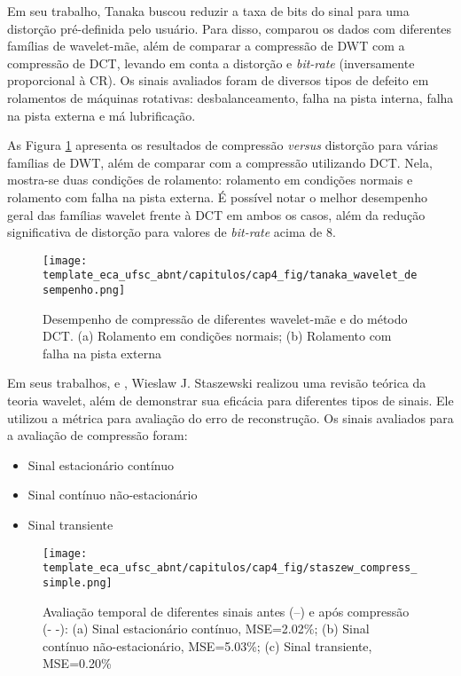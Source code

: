 Em seu trabalho, Tanaka buscou reduzir a taxa de bits do sinal para uma distorção pré-definida pelo usuário. Para disso, \cite{art:tanaka} comparou os dados com diferentes famílias de wavelet-mãe, além de comparar a compressão de \gls{DWT} com a compressão de \gls{DCT}, levando em conta a distorção e \textit{bit-rate} (inversamente proporcional à \gls{CR}). Os sinais avaliados foram de diversos tipos de defeito em rolamentos de máquinas rotativas: desbalanceamento, falha na pista interna,  falha na pista externa e má lubrificação. 

As Figura \ref{fig:tanaka_wavelet_desempenho} apresenta os resultados de compressão \textit{versus} distorção para várias famílias de \gls{DWT}, além de comparar com a compressão utilizando \gls{DCT}. Nela, mostra-se duas condições de rolamento: rolamento em condições normais e rolamento com falha na pista externa. É possível notar o melhor desempenho geral das famílias wavelet frente à \gls{DCT} em ambos os casos, além da redução significativa de distorção para valores de \textit{bit-rate} acima de 8.

\begin{figure}[htb]
	\caption{Desempenho de compressão de diferentes wavelet-mãe e do método \gls{DCT}. (a) Rolamento em condições normais; (b) Rolamento com falha na pista externa}
	\begin{center}
		\texttt{[image: template\_eca\_ufsc\_abnt/capitulos/cap4\_fig/tanaka\_wavelet\_desempenho.png]}
	\end{center}
	\label{fig:tanaka_wavelet_desempenho}
\end{figure}


Em seus trabalhos, \cite{art:staszew_vib_wavelet_compress_genetic} e \cite{art:staszew_vib_wavelet_compress_genetic2}, Wieslaw J. Staszewski realizou uma revisão teórica da teoria wavelet, além de demonstrar sua eficácia para diferentes tipos de sinais. Ele utilizou a métrica  para avaliação do erro de reconstrução. Os sinais avaliados para a avaliação de compressão foram:

\begin{itemize}
    \item Sinal estacionário contínuo
    \item Sinal contínuo não-estacionário
    \item Sinal transiente
\end{itemize}

\begin{figure}[htb]
	\caption{Avaliação temporal de diferentes sinais antes (--) e após compressão (- -): (a) Sinal estacionário contínuo, MSE=2.02\%; (b) Sinal contínuo não-estacionário, MSE=5.03\%; (c) Sinal transiente, MSE=0.20\%}
	\begin{center}
		\texttt{[image: template\_eca\_ufsc\_abnt/capitulos/cap4\_fig/staszew\_compress\_simple.png]}
	\end{center}
	\label{fig:staszew_vib_wavelet1}
\end{figure}


